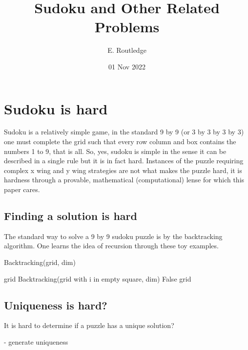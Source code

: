 \documentclass[a4paper,12pt]{article}
\author{E. Routledge}
\date{01 Nov 2022}
\title{Sudoku and Other Related Problems}
\begin{document}
\maketitle

\section{Sudoku is hard}

Sudoku is a relatively simple game, in the standard 9 by 9 (or 3 by 3 by 3 by 3) one must complete the grid such that every row column and box contains the numbers 1 to 9, that is all. So, yes, sudoku is simple in the sense it can be described in a single rule but it is in fact hard. Instances of the puzzle requiring complex x wing and y wing strategies are not what makes the puzzle hard, it is hardness through a provable, mathematical (computational) lense for which this paper cares. 

\subsection{Finding a solution is hard}
The standard way to solve a 9 by 9 sudoku puzzle is by the backtracking algorithm. One learns the idea of recursion through these toy examples.

\begin{algorithm}
	\caption{Backtracking(grid, dim)}\label{backtracking}
	\begin{algorithmic}[1]
						\State grid \leftarrow Backtracking(grid with i in empty square, dim)
				\EndIf
			 \Return False \Endif
			\Endfor
		\Endfor
		 \Return grid \Endif
	\end{algorithmic}
\end{algorithm}

\subsection{Uniqueness is hard?}
It is hard to determine if a puzzle has a unique solution?

- generate uniqueness
\end{document}
